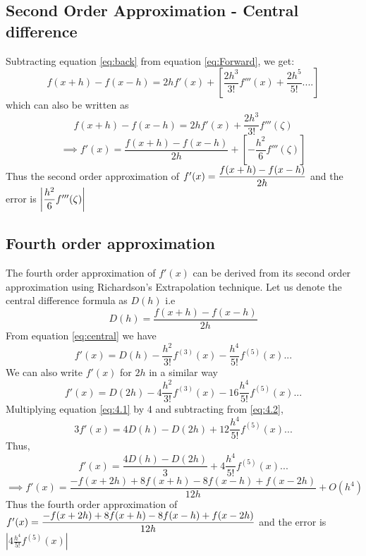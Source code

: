 \documentclass[11pt, a4paper]{article}
\begin{document}
\subsection{Second Order Approximation - Central difference}
Subtracting equation \ref{eq:back} from equation \ref{eq:Forward}, we get:
\begin{equation}
\label{eq:central}
 f(x+h) - f(x-h) = 2hf'(x) + \left[\frac{2h^3}{3!}f'''(x) + \frac{2h^5}{5!} ....\right]
\end{equation}
which can also be written as
\begin{equation*}
 f(x+h) - f(x-h) = 2hf'(x) + \frac{2h^3}{3!}f'''(\zeta)
\end{equation*}
\begin{equation}
 \implies f'(x) = \frac{f(x+h)-f(x-h)}{2h} +\left[-\frac{h^2}{6}f'''(\zeta)\right]
\end{equation}
Thus the second order approximation of $f'(x) = \mathlarger{\frac{f(x+h) - f(x-h)}{2h}}$ and the error is 
$\left|\mathlarger{\frac{h^2}{6}}f'''(\zeta)\right|$

\subsection{Fourth order approximation}
The fourth order approximation of $f'(x)$ can be derived from its second order approximation using Richardson's 
Extrapolation technique. Let us denote the central difference formula as $D(h)$ i.e
\begin{equation*}
 D(h) = \frac{f(x+h) - f(x-h)}{2h}
\end{equation*}
From equation \ref{eq:central} we have
\begin{equation}
\label{eq:4.1}
 f'(x) = D(h) - \frac{h^2}{3!}f^{(3)}(x) - \frac{h^4}{5!}f^{(5)}(x) ...
\end{equation}
We can also write $f'(x)$ for $2h$ in a similar way
\begin{equation}
\label{eq:4.2}
 f'(x) = D(2h) - 4\frac{h^2}{3!}f^{(3)}(x) - 16\frac{h^4}{5!}f^{(5)}(x) ...
\end{equation}
Multiplying equation \ref{eq:4.1} by 4 and subtracting from \ref{eq:4.2},
\begin{equation}
 3f'(x) = 4D(h) - D(2h) + 12\frac{h^4}{5!}f^{(5)}(x) ...
\end{equation}
Thus,
\begin{equation}
 f'(x) = \frac{4D(h) - D(2h)}{3} + 4\frac{h^4}{5!}f^{(5)}(x) ...
\end{equation}
\begin{equation}
 \implies f'(x) = \frac{-f(x+2h)+8f(x+h)-8f(x-h) + f(x-2h)}{12h} + O(h^4)
\end{equation}
Thus the fourth order approximation of \\$f'(x) = \mathlarger{\frac{-f(x+2h)+8f(x+h)-8f(x-h) + f(x-2h)}{12h}}$ and the 
error is $\left|4\frac{h^4}{5!}f^{(5)}(x)\right|$
\end{document}

